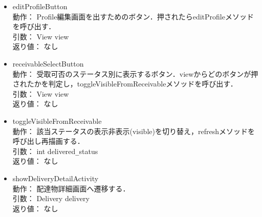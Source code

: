 \documentclass[a4j,titlepage]{jarticle}
\begin{document}
\begin{itemize}
  \item editProfileButton\\
  動作：  Profile編集画面を出すためのボタン．押されたらeditProfileメソッドを呼び出す．\\
  引数：  View view\\
  返り値：  なし

  \item receivableSelectButton\\
  動作：  受取可否のステータス別に表示するボタン．viewからどのボタンが押されたかを判定し，toggleVisibleFromReceivableメソッドを呼び出す．\\
  引数：  View view\\
  返り値：  なし

  \item toggleVisibleFromReceivable\\
  動作：  該当ステータスの表示非表示(visible)を切り替え，refreshメソッドを呼び出し再描画する．\\
  引数：  int delivered\verb|_|status\\
  返り値：  なし

  \item showDeliveryDetailActivity\\
  動作：  配達物詳細画面へ遷移する．\\
  引数：  Delivery delivery\\
  返り値：  なし
\end{itemize}
\end{document}
